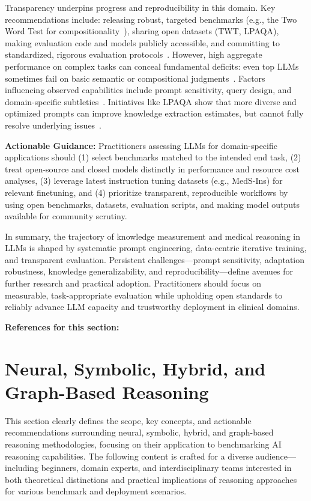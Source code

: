 \documentclass[sigconf]{acmart}
\begin{document}
Transparency underpins progress and reproducibility in this domain. Key recommendations include: releasing robust, targeted benchmarks (e.g., the Two Word Test for compositionality~\cite{ref96}), sharing open datasets (TWT, LPAQA), making evaluation code and models publicly accessible, and committing to standardized, rigorous evaluation protocols~\cite{ref94,ref95,ref96,ref98}. However, high aggregate performance on complex tasks can conceal fundamental deficits: even top LLMs sometimes fail on basic semantic or compositional judgments~\cite{ref96}. Factors influencing observed capabilities include prompt sensitivity, query design, and domain-specific subtleties~\cite{ref98}. Initiatives like LPAQA show that more diverse and optimized prompts can improve knowledge extraction estimates, but cannot fully resolve underlying issues~\cite{ref98}.

\textbf{Actionable Guidance:} Practitioners assessing LLMs for domain-specific applications should (1) select benchmarks matched to the intended end task, (2) treat open-source and closed models distinctly in performance and resource cost analyses, (3) leverage latest instruction tuning datasets (e.g., MedS-Ins) for relevant finetuning, and (4) prioritize transparent, reproducible workflows by using open benchmarks, datasets, evaluation scripts, and making model outputs available for community scrutiny.

In summary, the trajectory of knowledge measurement and medical reasoning in LLMs is shaped by systematic prompt engineering, data-centric iterative training, and transparent evaluation. Persistent challenges—prompt sensitivity, adaptation robustness, knowledge generalizability, and reproducibility—define avenues for further research and practical adoption. Practitioners should focus on measurable, task-appropriate evaluation while upholding open standards to reliably advance LLM capacity and trustworthy deployment in clinical domains.

\textbf{References for this section:}~\cite{ref94,ref95,ref96,ref98}

\section{Neural, Symbolic, Hybrid, and Graph-Based Reasoning}

This section clearly defines the scope, key concepts, and actionable recommendations surrounding neural, symbolic, hybrid, and graph-based reasoning methodologies, focusing on their application to benchmarking AI reasoning capabilities. The following content is crafted for a diverse audience—including beginners, domain experts, and interdisciplinary teams interested in both theoretical distinctions and practical implications of reasoning approaches for various benchmark and deployment scenarios.
\end{document}
